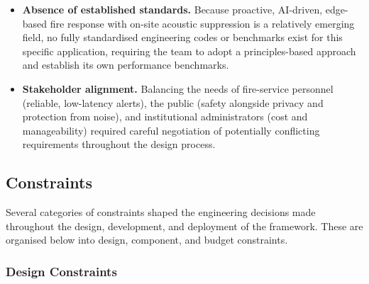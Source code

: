 \begin{itemize}
\item \textbf{Absence of established standards.} Because proactive, AI-driven, edge-based fire response with on-site acoustic suppression is a relatively emerging field, no fully standardised engineering codes or benchmarks exist for this specific application, requiring the team to adopt a principles-based approach and establish its own performance benchmarks.

\item \textbf{Stakeholder alignment.} Balancing the needs of fire-service personnel (reliable, low-latency alerts), the public (safety alongside privacy and protection from noise), and institutional administrators (cost and manageability) required careful negotiation of potentially conflicting requirements throughout the design process.
\end{itemize}

\subsection{Constraints}

Several categories of constraints shaped the engineering decisions made throughout the design, development, and deployment of the framework. These are organised below into design, component, and budget constraints.

\subsubsection{Design Constraints}

